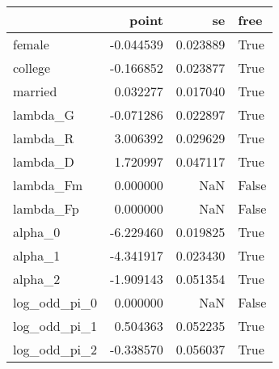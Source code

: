 \begin{tabular}{lrrl}
\toprule
{} &     point &        se &   free \\
\midrule
female       & -0.044539 &  0.023889 &   True \\
college      & -0.166852 &  0.023877 &   True \\
married      &  0.032277 &  0.017040 &   True \\
lambda\_G     & -0.071286 &  0.022897 &   True \\
lambda\_R     &  3.006392 &  0.029629 &   True \\
lambda\_D     &  1.720997 &  0.047117 &   True \\
lambda\_Fm    &  0.000000 &       NaN &  False \\
lambda\_Fp    &  0.000000 &       NaN &  False \\
alpha\_0      & -6.229460 &  0.019825 &   True \\
alpha\_1      & -4.341917 &  0.023430 &   True \\
alpha\_2      & -1.909143 &  0.051354 &   True \\
log\_odd\_pi\_0 &  0.000000 &       NaN &  False \\
log\_odd\_pi\_1 &  0.504363 &  0.052235 &   True \\
log\_odd\_pi\_2 & -0.338570 &  0.056037 &   True \\
\bottomrule
\end{tabular}
